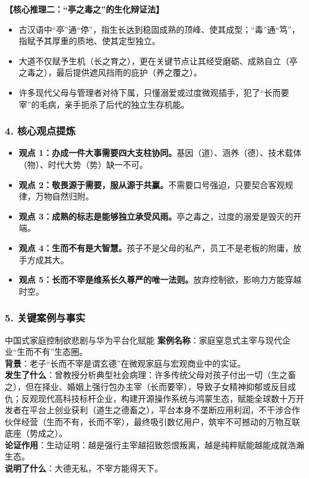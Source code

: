 \noindent\textbf{【核心推理二：“亭之毒之”的生化辩证法】}
\begin{itemize}
    \item 古汉语中“亭”通“停”，指生长达到稳固成熟的顶峰、使其成型；“毒”通“笃”，指赋予其厚重的质地、使其定型独立。
    \item 大道不仅赋予生机（长之育之），更在关键节点让其经受磨砺、成熟自立（亭之毒之），最后提供遮风挡雨的庇护（养之覆之）。
    \item 许多现代父母与管理者对待下属，只懂溺爱或过度微观插手，犯了“长而要宰”的毛病，亲手扼杀了后代的独立生存机能。
\end{itemize}

\subsubsection{4. 核心观点提炼}
\begin{itemize}
    \item \textbf{观点 1：办成一件大事需要四大支柱协同。}基因（道）、涵养（德）、技术载体（物）、时代大势（势）缺一不可。
    \item \textbf{观点 2：敬畏源于需要，服从源于共赢。}不需要口号强迫，只要契合客观规律，万物自然归附。
    \item \textbf{观点 3：成熟的标志是能够独立承受风雨。}亭之毒之，过度的溺爱是毁灭的开端。
    \item \textbf{观点 4：生而不有是大智慧。}孩子不是父母的私产，员工不是老板的附庸，放手方成其大。
    \item \textbf{观点 5：长而不宰是维系长久尊严的唯一法则。}放弃控制欲，影响力方能穿越时空。
\end{itemize}

\subsubsection{5. 关键案例与事实}
\begin{CaseBox}{中国式家庭控制欲悲剧与华为平台化赋能}
\textbf{案例名称}：家庭窒息式主宰与现代企业“生而不有”生态圈。\\
\textbf{背景}：老子“长而不宰是谓玄德”在微观家庭与宏观商业中的实证。\\
\textbf{发生了什么}：曾教授分析典型社会病理：许多传统父母对孩子付出一切（生之畜之），但在择业、婚姻上强行包办主宰（长而要宰），导致子女精神抑郁或反目成仇；反观现代高科技标杆企业，构建开源操作系统与鸿蒙生态，赋能全球数十万开发者在平台上创业获利（道生之德畜之），平台本身不垄断应用利润，不干涉合作伙伴经营（生而不有，长而不宰），最终吸引数亿用户，筑牢不可撼动的万物互联底座（势成之）。\\
\textbf{论证作用}：生动证明：越是强行主宰越招致怨恨叛离，越是纯粹赋能越能成就浩瀚生态。\\
\textbf{说明了什么}：大德无私，不宰方能得天下。
\end{CaseBox}

